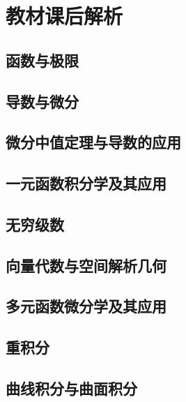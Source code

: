\documentclass[openany,customfont=true]{HTNotes}
\begin{document}
\maketitle
\makeflypage

\frontmatter
\tableofcontents

\mainmatter
\part{教材课后解析}
  \chapter{函数与极限}

  \chapter{导数与微分}

  \chapter{微分中值定理与导数的应用}

  \chapter{一元函数积分学及其应用}

  \chapter{无穷级数}

  \chapter{向量代数与空间解析几何}

  \chapter{多元函数微分学及其应用}

  \chapter{重积分}

  \chapter{曲线积分与曲面积分}
\end{document}
